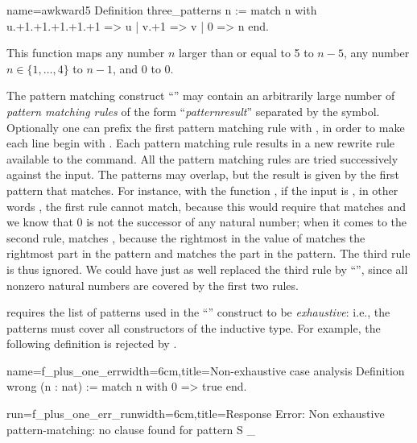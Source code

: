 \begin{coq}{name=awkward5}{}
Definition three_patterns n :=
  match n with
    u.+1.+1.+1.+1.+1 => u
  | v.+1 => v
  | 0 => n
  end.
\end{coq}

This function maps any number \(n\) larger than or equal to 5 to \(n-5\),
any number \(n \in \{1, \ldots, 4\}\) to \(n-1\), and \(0\) to \(0\).

The pattern matching construct ``'' may contain an
arbitrarily large number of {\em pattern matching rules} of the form
``\emph{pattern}\C{ =>$~$}\emph{result}''
separated by the \C{|} symbol.  Optionally one can
prefix the first pattern matching rule with \C{|}, in order to make each line
begin with \C{|}. Each pattern matching rule results in a new rewrite
rule available to the  command.
All
the pattern matching rules are tried successively against the input.  The
patterns may overlap, but the result is given by the first pattern that
matches.
For instance, with the function , if the input is
, in other words , the first
rule cannot match, because this would require that  matches
 and we know that \(0\) is not the successor of any
natural number; when it comes to the second rule,  matches
, because the rightmost  in the value of  matches
the rightmost  part in the pattern and  matches the 
part in the pattern.  The third rule is thus ignored.
We could have just as well replaced the third rule by ``'',
since all nonzero natural numbers are covered by the first two rules.

\Coq{} requires the list of patterns used in the
``'' construct to be
\emph{exhaustive}: i.e., the patterns must cover all constructors of
the inductive type.  For example, the following definition is
rejected by \Coq{}.

\begin{coq-left}{name=f_plus_one_err}{width=6cm,title=Non-exhaustive case analysis}
Definition wrong (n : nat) :=
  match n with 0 => true end.
$~$
\end{coq-left}
\begin{coqout-right}{run=f_plus_one_err_run}{width=6cm,title=Response}
Error: Non exhaustive pattern-matching:
no clause found for
pattern S _
\end{coqout-right}

